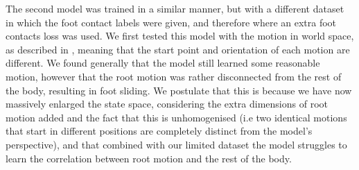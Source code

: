 The second model was trained in a similar manner, but with a different dataset in which the foot contact labels were given, and therefore where an extra foot contacts loss was used. We first tested this model with the motion in world space, as described in , meaning that the start point and orientation of each motion are different. We found generally that the model still learned some reasonable motion, however that the root motion was rather disconnected from the rest of the body, resulting in foot sliding. We postulate that this is because we have now massively enlarged the state space, considering the extra dimensions of root motion added and the fact that this is unhomogenised (i.e two identical motions that start in different positions are completely distinct from the model's perspective), and that combined with our limited dataset the model struggles to learn the correlation between root motion and the rest of the body.



